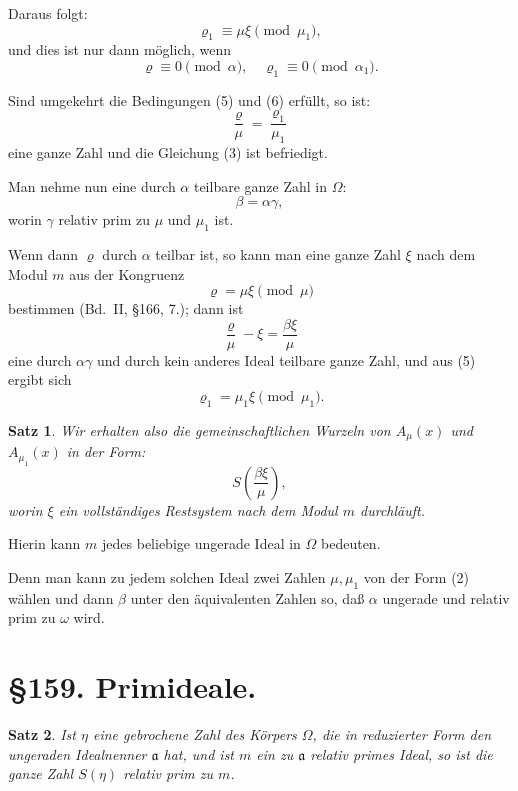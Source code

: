 \documentclass[12pt,a4paper]{article}
\newtheorem*{satz}{Satz}
\begin{document}
Daraus folgt:
\begin{equation}\varrho_1 \equiv \mu\xi \pmod{\mu_1},\end{equation}
und dies ist nur dann m\"oglich, wenn
\begin{equation}\varrho \equiv 0 \pmod{\alpha}, \quad \varrho_1 \equiv 0 \pmod{\alpha_1}.\end{equation}

Sind umgekehrt die Bedingungen (5) und (6) erf\"ullt, so ist:
\[\frac{\varrho}{\mu} = \frac{\varrho_1}{\mu_1}\]
eine ganze Zahl und die Gleichung (3) ist befriedigt.

Man nehme nun eine durch $\alpha$ teilbare ganze Zahl in $\Omega$:
\begin{equation}\beta = \alpha\gamma,\end{equation}
worin $\gamma$ relativ prim zu $\mu$ und $\mu_1$ ist.

Wenn dann $\varrho$ durch $\alpha$ teilbar ist, so kann man eine ganze Zahl $\xi$ nach dem Modul $m$ aus der Kongruenz
\[\varrho = \mu\xi \pmod{\mu}\]
bestimmen (Bd.~II, \S 166, 7.); dann ist
\[\frac{\varrho}{\mu} - \xi = \frac{\beta\xi}{\mu}\]
eine durch $\alpha\gamma$ und durch kein anderes Ideal teilbare ganze Zahl, und aus (5) ergibt sich
\[\varrho_1 = \mu_1\xi \pmod{\mu_1}.\]

\begin{satz}
Wir erhalten also die gemeinschaftlichen Wurzeln von $A_\mu(x)$ und $A_{\mu_1}(x)$ in der Form:
\begin{equation}S\left(\frac{\beta\xi}{\mu}\right),\end{equation}
worin $\xi$ ein vollst\"andiges Restsystem nach dem Modul $m$ durchl\"auft.
\end{satz}

Hierin kann $m$ jedes beliebige ungerade Ideal in $\Omega$ bedeuten.

Denn man kann zu jedem solchen Ideal zwei Zahlen $\mu, \mu_1$ von der Form (2) w\"ahlen und dann $\beta$ unter den \"aquivalenten Zahlen so, da\ss{} $\alpha$ ungerade und relativ prim zu $\omega$ wird.

\section*{\S 159. Primideale.}

\begin{satz}
Ist $\eta$ eine gebrochene Zahl des K\"orpers $\Omega$, die in reduzierter Form den ungeraden Idealnenner $\mathfrak{a}$ hat, und ist $m$ ein zu $\mathfrak{a}$ relativ primes Ideal, so ist die ganze Zahl $S(\eta)$ relativ prim zu $m$.
\end{satz}
\end{document}
